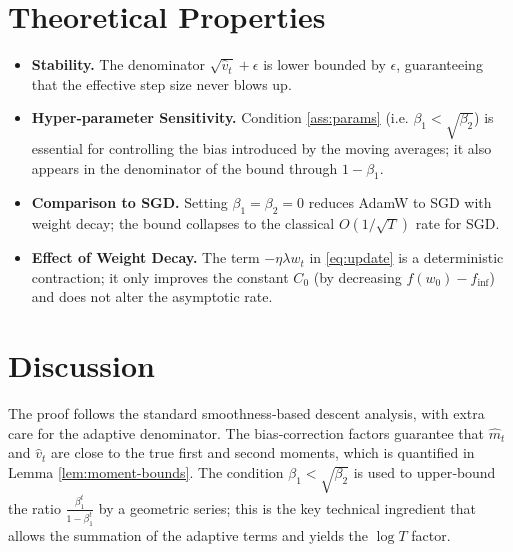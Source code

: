 \documentclass{article}
\begin{document}
\section*{Theoretical Properties}
\begin{itemize}
  \item \textbf{Stability.} The denominator $\sqrt{\hat v_{t}}+\epsilon$ is lower bounded by $\epsilon$, guaranteeing that the effective step size never blows up.
  \item \textbf{Hyper‑parameter Sensitivity.} Condition \eqref{ass:params} (i.e. $\beta_{1}<\sqrt{\beta_{2}}$) is essential for controlling the bias introduced by the moving averages; it also appears in the denominator of the bound through $1-\beta_{1}$.
  \item \textbf{Comparison to SGD.} Setting $\beta_{1}=\beta_{2}=0$ reduces AdamW to SGD with weight decay; the bound collapses to the classical $O(1/\sqrt{T})$ rate for SGD.
  \item \textbf{Effect of Weight Decay.} The term $-\eta\lambda w_{t}$ in \eqref{eq:update} is a deterministic contraction; it only improves the constant $C_{0}$ (by decreasing $f(w_{0})-f_{\inf}$) and does not alter the asymptotic rate.
\end{itemize}

\section*{Discussion}
The proof follows the standard smoothness‑based descent analysis, with extra care for the adaptive denominator. The bias‑correction factors guarantee that $\hat m_{t}$ and $\hat v_{t}$ are close to the true first and second moments, which is quantified in Lemma \ref{lem:moment-bounds}. The condition $\beta_{1}<\sqrt{\beta_{2}}$ is used to upper‑bound the ratio $\frac{\beta_{1}^{t}}{1-\beta_{1}^{t}}$ by a geometric series; this is the key technical ingredient that allows the summation of the adaptive terms and yields the $\log T$ factor.

\end{document}

